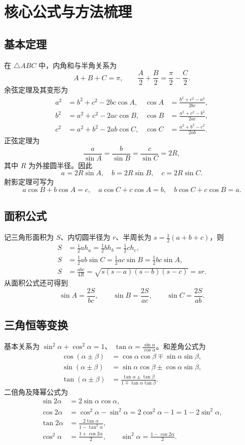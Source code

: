 
\section{核心公式与方法梳理}

\subsection{基本定理}
在 $\triangle ABC$ 中，内角和与半角关系为
\[
  A+B+C=\pi,\qquad
  \frac A2+\frac B2=\frac\pi2-\frac C2.
\]
余弦定理及其变形为
\begin{align*}
  a^2&=b^2+c^2-2bc\cos A,& \cos A&=\frac{b^2+c^2-a^2}{2bc},\\
  b^2&=a^2+c^2-2ac\cos B,& \cos B&=\frac{a^2+c^2-b^2}{2ac},\\
  c^2&=a^2+b^2-2ab\cos C,& \cos C&=\frac{a^2+b^2-c^2}{2ab}.
\end{align*}
正弦定理为
\[
  \frac a{\sin A}=\frac b{\sin B}=\frac c{\sin C}=2R,
\]
其中 $R$ 为外接圆半径。因此
\[
  a=2R\sin A,\quad b=2R\sin B,\quad c=2R\sin C.
\]
射影定理可写为
\[
  a\cos B+b\cos A=c,\quad
  a\cos C+c\cos A=b,\quad
  b\cos C+c\cos B=a.
\]

\subsection{面积公式}
记三角形面积为 $S$、内切圆半径为 $r$、半周长为
$s=\frac12(a+b+c)$，则
\begin{align*}
  S&=\frac12ah_a=\frac12bh_b=\frac12ch_c,\\
  S&=\frac12ab\sin C=\frac12ac\sin B=\frac12bc\sin A,\\
  S&=\frac{abc}{4R}=\sqrt{s(s-a)(s-b)(s-c)}=sr.
\end{align*}
从面积公式还可得到
\[
  \sin A=\frac{2S}{bc},\qquad
  \sin B=\frac{2S}{ac},\qquad
  \sin C=\frac{2S}{ab}.
\]

\subsection{三角恒等变换}
基本关系为 $\sin^2\alpha+\cos^2\alpha=1$、
$\tan\alpha=\frac{\sin\alpha}{\cos\alpha}$。和差角公式为
\begin{align*}
 \cos(\alpha\pm\beta)&=\cos\alpha\cos\beta\mp\sin\alpha\sin\beta,\\
 \sin(\alpha\pm\beta)&=\sin\alpha\cos\beta\pm\cos\alpha\sin\beta,\\
 \tan(\alpha\pm\beta)&=\frac{\tan\alpha\pm\tan\beta}
 {1\mp\tan\alpha\tan\beta}.
\end{align*}
二倍角及降幂公式为
\begin{align*}
 \sin2\alpha&=2\sin\alpha\cos\alpha,\\
 \cos2\alpha&=\cos^2\alpha-\sin^2\alpha
 =2\cos^2\alpha-1=1-2\sin^2\alpha,\\
 \tan2\alpha&=\frac{2\tan\alpha}{1-\tan^2\alpha},\\
 \cos^2\alpha&=\frac{1+\cos2\alpha}{2},\qquad
 \sin^2\alpha=\frac{1-\cos2\alpha}{2}.
\end{align*}

